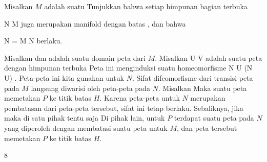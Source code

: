 {

Misalkan $M$ adalah suatu
Tunjukkan bahwa setiap himpunan bagian terbuka

\mavergleichskette
{\vergleichskette
{ N
}
{ \subseteq }{ M
}
{  }{
}
{    }{
}
{   }{
}
}
{}{}{}
juga merupakan manifold dengan batas
 {} {},
dan bahwa

\mavergleichskettedisp
{\vergleichskette
{ \partial N
}
{ =} { \partial M \cap N
}
{ } {
}
{ } {
}
{ } {
}
}
{}{}{}
berlaku.

}
{

Misalkan
 dan
 adalah suatu domain peta dari $M$. Misalkan
\maabbdisp {\alpha} { U } {V
} {}
adalah suatu peta dengan himpunan terbuka
 Peta ini menginduksi suatu homeomorfisme
\maabbdisp {} {N \cap U} { \alpha (N \cap U)
} {.}
Peta-peta ini kita gunakan untuk $N$. Sifat difeomorfisme dari transisi peta pada $M$ langsung diwarisi oleh peta-peta pada $N$. Misalkan
 Maka suatu peta memetakan $P$ ke titik batas $H$. Karena peta-peta untuk $N$ merupakan pembatasan dari peta-peta tersebut, sifat ini tetap berlaku. Sebaliknya, jika
 maka di satu pihak tentu saja
 Di pihak lain, untuk $P$ terdapat suatu peta pada $N$ yang diperoleh dengan membatasi suatu peta untuk $M$, dan peta tersebut memetakan $P$ ke titik batas $H$.

 }



{8}

